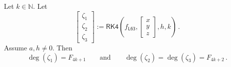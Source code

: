\documentclass{article}
\newcommand{\N}{\mathbb{N}}
\newcommand{\lb}{\left(} %
\newcommand{\rb}{\right)} %
\newcommand{\br}[1]{\lb #1 \rb} %
\newcommand{\brOf}[1]{\!\br{#1}} %
\newcommand{\eqfs}{\,.}
\begin{document}
\begin{theorem}
	Let $k \in \N$.
	Let
	\begin{equation*}
		\begin{bmatrix}
			\zeta_1\\
			\zeta_2\\
			\zeta_3
		\end{bmatrix}
		:=
		\mathsf{RK4}\brOf{f_{\mathsf{L63}}, \begin{bmatrix}
				x\\
				y\\
				z
			\end{bmatrix}, h, k}
		\eqfs
	\end{equation*}
	Assume $a,h\neq 0$.
	Then
	\begin{equation*}
		\deg(\zeta_1) = F_{4k+1}
		\qquad\text{and}\qquad
		\deg(\zeta_2) = \deg(\zeta_3) = F_{4k+2}
		\eqfs
	\end{equation*}
\end{theorem}
%
\end{document}
